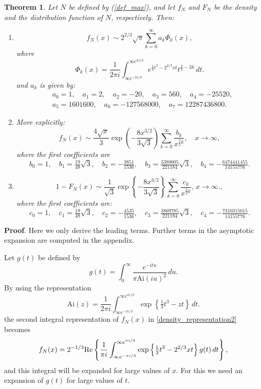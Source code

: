 \documentclass[11pt]{article}
\newtheorem{theorem}{Theorem}[section]
\begin{document}
\begin{theorem}
\label{th:main_result}
Let $N$ be defined by (\ref{def_max}), and let $f_N$ and $F_N$ be the density and the distribution function of $N$, respectively. Then:
\begin{enumerate}
\item[(i)]
\begin{equation}
\label{asymp_representation2}
f_N(x)\sim2^{2/3}\sqrt{\pi}\sum_{k=0}^\infty a_k \Phi_k(x),
\end{equation}
where
$$
\Phi_k(x)=\frac1{2\pi i}
\int_{\infty e^{-\pi i/3}}^{\infty e^{\pi i/3}} e^{\frac14t^3-2^{2/3}xt}t^{\frac32-3k}\,dt.
$$
and $a_k$ is given by:
\begin{align*}
\label{trans4}
&a_0=  1,\quad 
a_1=  2,\quad 
a_2=  -20,\quad 
a_3=  560,\quad
a_4=  -25520,\\
&a_5=  1601600,\quad 
a_6=  -127568000,\quad 
a_7=  12287436800.
\end{align*}

\item[(ii)] More explicitly:
\begin{equation}
\label{fNxasymp1}
f_N(x)\sim\frac{4\sqrt{x}}{3}\exp\left(-\frac{8x^{3/2}}{3\sqrt{3}}\right)\sum_{k=0}^\infty \frac{b_k}{x^{\frac32k}},\quad x\to\infty,
\end{equation}
where the first coefficients are
$$
b_0=  1,\quad 
b_1=  \tfrac{19}{48}\sqrt{3},
\quad 
b_2=  -\tfrac{3851}{1536},\quad 
b_3=   \tfrac{3380005}{221184}\sqrt{3},\quad
b_4=-\tfrac{6474441455}{14155776}.
$$
\item[(iii)]
$$
1-F_N(x)\sim \frac1{\sqrt{3}}\exp\left\{-\frac{8x^{3/2}}{3\sqrt{3}}\right\}\sum_{k=0}^{\infty}\frac{c_k}{x^{\tfrac32k}},\,x\to\infty.,
$$
where the first coefficients are:
$$
c_0= 1, \quad
c_1= \tfrac{19}{48}\sqrt{3},\quad
c_2= -\tfrac{4535}{1536},\quad
c_3= \tfrac{3869785}{221184}\sqrt{3},\quad
c_4= -\tfrac{7310315015}{14155776}.
$$
\end{enumerate}
\end{theorem}
\noindent
{\bf Proof}.
Here we only derive the leading terms. Further terms in the asymptotic expansion are computed in the appendix.

Let $g(t)$ be defined by
\begin{equation}\label{gtdef}
g(t)=\int_0^{\infty}\frac{e^{-itu}}{\pi{\mbox{Ai}}(iu)^2}\,du.
\end{equation}
By using the representation
$$
{\mbox{Ai}}(z)=\frac1{2\pi i}\int_{\infty e^{-\pi i/3}}^{\infty e^{\pi i/3}}
\exp\left\{\tfrac13t^3-zt\right\}\,dt.
$$
the second integral representation of $f_N(x)$ in \eqref{density_representation2} becomes
\begin{equation}
\label{asymp_representation}
f_N(x)=2^{-1/3}\mbox{\rm Re}\left\{\frac1{\pi i}\int_{\infty e^{-\pi i/3}}^{\infty e^{\pi i/3}} \exp\left\{\tfrac13t^3-2^{2/3}xt\right\}g(t)\,dt\right\},
\end{equation}
and this integral will be expanded for large values of $x$. For this we need an expansion of $g(t)$ for large values of $t$.
\end{document}
